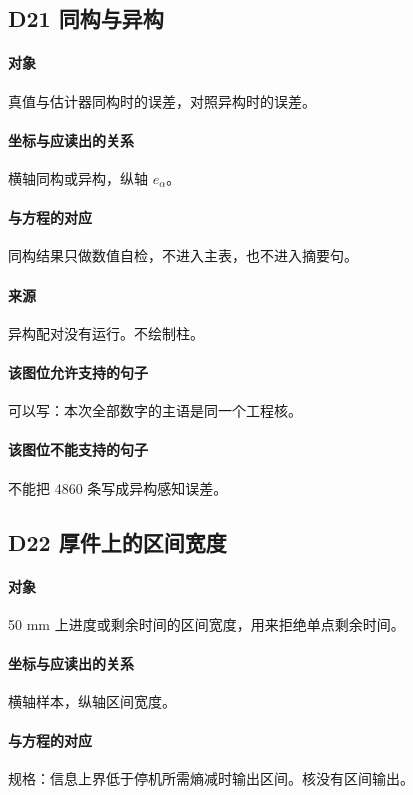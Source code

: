 \subsection{D21 同构与异构}
\paragraph{对象}
真值与估计器同构时的误差，对照异构时的误差。

\paragraph{坐标与应读出的关系}
横轴同构或异构，纵轴 $e_\alpha$。

\paragraph{与方程的对应}
同构结果只做数值自检，不进入主表，也不进入摘要句。

\paragraph{来源}
异构配对没有运行。不绘制柱。

\paragraph{该图位允许支持的句子}
可以写：本次全部数字的主语是同一个工程核。

\paragraph{该图位不能支持的句子}
不能把 4860 条写成异构感知误差。

\subsection{D22 厚件上的区间宽度}
\paragraph{对象}
50 mm 上进度或剩余时间的区间宽度，用来拒绝单点剩余时间。

\paragraph{坐标与应读出的关系}
横轴样本，纵轴区间宽度。

\paragraph{与方程的对应}
规格：信息上界低于停机所需熵减时输出区间。核没有区间输出。

